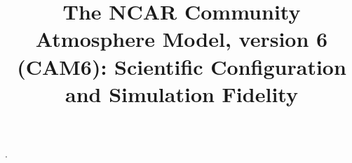 \documentclass[linenumbers]{agujournal2018}
\begin{document}
\title{The NCAR Community Atmosphere Model, version 6 (CAM6): Scientific Configuration and Simulation Fidelity}



\linenumbers
\modulolinenumbers[1]












.








%


%



%
\end{document}
